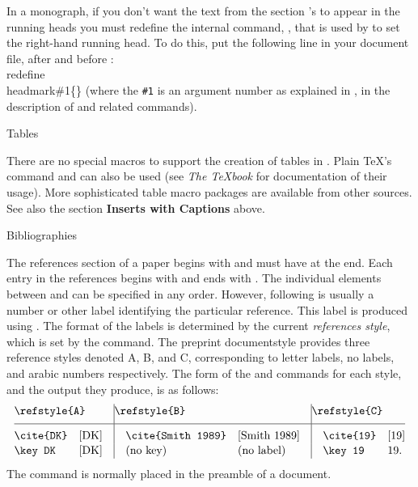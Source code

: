 In a monograph, if you don't want
the text from the section 's to appear in the running heads
you must redefine the internal command, , that is used
by  to set the right-hand running head. To do this, put the
following line in your document file, after  and
before :
\beginexample{}
\\redefine\\headmark\#1\{\}
\endexample
\noindent (where the {\tt\#1} is an argument number as explained in \Joy,
in the description of  and related commands).

\subhead Tables \endsubhead

There are no special macros to support the creation of tables in
\AmSTeX{}. Plain \TeX{}'s 
command and  can also be used (see {\it The \TeX{}book} for
documentation of their usage). More sophisticated table macro packages
are available from other sources. See also the section {\bf Inserts with
Captions} above.

\subhead Bibliographies \endsubhead

The references section of a paper begins with  and must have
 at the end.  Each entry in the references begins with
 and ends with .  The individual elements between
 and  can be specified in any order. However,
following  is usually a number or other label identifying the
particular reference. This label is produced using .
The format of the labels is determined by the current
{\it references style}, which is set by the 
command. The preprint documentstyle provides three reference
styles denoted A, B, and C, corresponding to
letter labels, no labels, and arabic numbers respectively.
The form of the  and  commands for each
style, and the output they produce, is as follows:
$$
\vbox{\offinterlineskip\def\strut{\vrule depth.35\normalbaselineskip
  width0pt height.75\normalbaselineskip}\tabskip0pt
  \halign{{\tt\strut#}\hfil&\quad#\hfil&\quad\vrule\quad{\tt#}\hfil&
       \quad#\hfil&\quad\vrule\quad{\tt#}\hfil&\quad#\hfil\cr
\multispan2\strut depth.7\normalbaselineskip\hfil\cs{refstyle\{A\}}\hfil&
       \multispan2\quad\vrule\hfil\cs{refstyle\{B\}}\hfil&
              \multispan2\quad\vrule\hfil\cs{refstyle\{C\}}\hfil\cr
%
\noalign{\hrule}
%
 height1.1\normalbaselineskip\cs{cite\{DK\}}& [DK]&
       \cs{cite\{Smith 1989\}}& [Smith 1989]&
              \cs{cite\{19\}}& [19]\cr
%
\cs{key DK}& [DK]&
       \omit\quad\vrule\quad(no key)\hfil & (no label)&
              \cs{key 19}& 19.\cr
}}$$
The  command is normally placed in the preamble of
a document.

